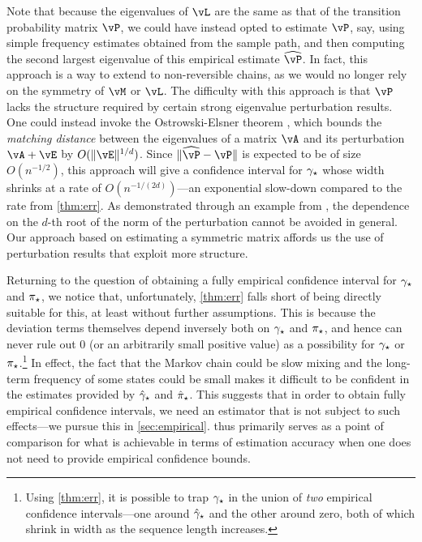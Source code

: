 Note that because the eigenvalues of $\vL$ are the same as that of the
transition probability matrix $\vP$, 
we could have instead opted to
estimate $\vP$, say, using simple frequency estimates obtained from
the sample path, and then computing the second largest eigenvalue of
this empirical estimate $\wh\vP$.
In fact, this approach is a way to extend to non-reversible chains, as
we would no longer rely on the symmetry of $\vM$ or $\vL$.
The difficulty with this approach is that $\vP$ lacks the structure
required by certain strong eigenvalue perturbation results.
One could instead invoke the Ostrowski-Elsner theorem
\citep[cf.~Theorem 1.4 on Page 170 of][]{stewart1990matrix}, which
bounds the \emph{matching distance} between the eigenvalues of a
matrix $\vA$ and its perturbation $\vA+\vE$ by $O(\norm{\vE}^{1/d})$.
Since $\norm{\wh\vP-\vP}$ is expected to be of size $O(n^{-1/2})$,
this approach will give a confidence interval for $\gamma_{\star}$ whose width
shrinks at a rate of $O(n^{-1/(2d)})$---an exponential slow-down
compared to the rate from \cref{thm:err}.
As demonstrated through an example from \citet{stewart1990matrix}, the
dependence on the $d$-th root of the norm of the perturbation cannot
be avoided in general.
Our approach based on estimating a symmetric matrix affords us the use
of perturbation results that exploit more structure.

Returning to the question of obtaining a fully empirical confidence 
interval for $\gamma_{\star}$ and $\pi_{\star}$, we notice that,
unfortunately, \cref{thm:err} falls short of being directly suitable for this,
at least without further assumptions.
This is because the deviation terms themselves depend inversely both
on $\gamma_{\star}$ and $\pi_{\star}$, and hence can never rule out $0$ (or an
arbitrarily small positive value) as a possibility for $\gamma_{\star}$ or
$\pi_{\star}$.\footnote{%
  Using \cref{thm:err}, it is possible to trap $\gamma_{\star}$ in the
  union of \emph{two} empirical confidence intervals---one around
  $\hat\gamma_{\star}$ and the other around zero, both of which shrink in width
  as the sequence length increases.%
}
In effect, the fact that the Markov chain could be slow mixing and the
long-term frequency of some states could be small makes it difficult
to be confident in the estimates provided by $\hat\gamma_{\star}$ and
$\hat\pi_{\star}$.
This suggests that in order to obtain fully empirical confidence
intervals, we need an estimator that is not subject to such
effects---we pursue this in \cref{sec:empirical}.
 thus primarily serves as a point of comparison
for what is achievable in terms of estimation accuracy when one does
not need to provide empirical confidence bounds.


